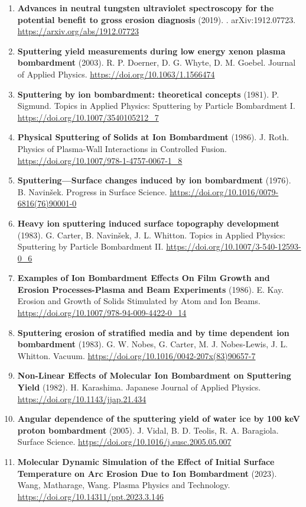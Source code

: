 \documentclass[11pt,a4paper]{article}
\begin{document}
\begin{enumerate}[leftmargin=1.4em]
\item \textbf{Advances in neutral tungsten ultraviolet spectroscopy for the potential benefit to gross erosion diagnosis} (2019). . arXiv:1912.07723. \url{https://arxiv.org/abs/1912.07723}
\item \textbf{Sputtering yield measurements during low energy xenon plasma bombardment} (2003). R. P. Doerner, D. G. Whyte, D. M. Goebel. Journal of Applied Physics. \url{https://doi.org/10.1063/1.1566474}
\item \textbf{Sputtering by ion bombardment: theoretical concepts} (1981). P. Sigmund. Topics in Applied Physics: Sputtering by Particle Bombardment I. \url{https://doi.org/10.1007/3540105212_7}
\item \textbf{Physical Sputtering of Solids at Ion Bombardment} (1986). J. Roth. Physics of Plasma-Wall Interactions in Controlled Fusion. \url{https://doi.org/10.1007/978-1-4757-0067-1_8}
\item \textbf{Sputtering—Surface changes induced by ion bombardment} (1976). B. Navinšek. Progress in Surface Science. \url{https://doi.org/10.1016/0079-6816(76)90001-0}
\item \textbf{Heavy ion sputtering induced surface topography development} (1983). G. Carter, B. Navinšek, J. L. Whitton. Topics in Applied Physics: Sputtering by Particle Bombardment II. \url{https://doi.org/10.1007/3-540-12593-0_6}
\item \textbf{Examples of Ion Bombardment Effects On Film Growth and Erosion Processes-Plasma and Beam Experiments} (1986). E. Kay. Erosion and Growth of Solids Stimulated by Atom and Ion Beams. \url{https://doi.org/10.1007/978-94-009-4422-0_14}
\item \textbf{Sputtering erosion of stratified media and by time dependent ion bombardment} (1983). G. W. Nobes, G. Carter, M. J. Nobes-Lewis, J. L. Whitton. Vacuum. \url{https://doi.org/10.1016/0042-207x(83)90657-7}
\item \textbf{Non-Linear Effects of Molecular Ion Bombardment on Sputtering Yield} (1982). H. Karashima. Japanese Journal of Applied Physics. \url{https://doi.org/10.1143/jjap.21.434}
\item \textbf{Angular dependence of the sputtering yield of water ice by 100 keV proton bombardment} (2005). J. Vidal, B. D. Teolis, R. A. Baragiola. Surface Science. \url{https://doi.org/10.1016/j.susc.2005.05.007}
\item \textbf{Molecular Dynamic Simulation of the Effect of Initial Surface Temperature on Arc Erosion Due to Ion Bombardment} (2023). Wang, Matharage, Wang. Plasma Physics and Technology. \url{https://doi.org/10.14311/ppt.2023.3.146}

\end{enumerate}
\end{document}
